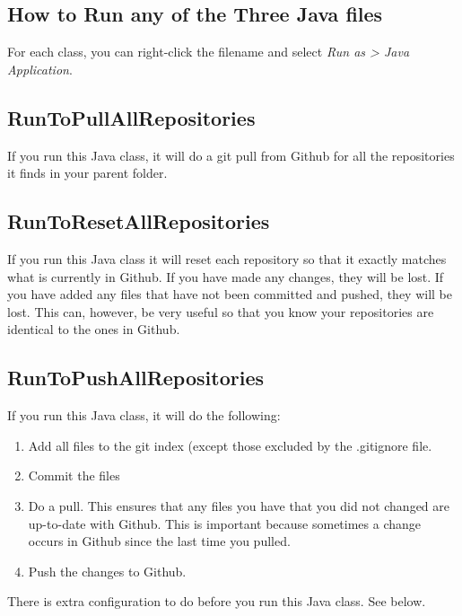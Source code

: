 \documentclass[]{memoir}
\begin{document}
\subsection{How to Run any of the Three Java files}

For each class, you can right-click the filename and select \textit{Run as > Java Application}.

\subsection{RunToPullAllRepositories}

If you run this Java class, it will do a git pull from Github for all the repositories it finds in your parent folder.

\subsection{RunToResetAllRepositories}

If you run this Java class it will reset each repository so that it exactly matches what is currently in Github.  If you have made any changes, they will be lost.  If you have added any files that have not been committed and pushed, they will be lost.  This can, however, be very useful so that you know your repositories are identical to the ones in Github.

\subsection{RunToPushAllRepositories}

If you run this Java class, it will do the following:

\begin{enumerate}
    \item Add all files to the git index (except those excluded by the .gitignore file.
    \item Commit the files
    \item Do a pull.  This ensures that any files you have that you did not changed are up-to-date with Github.  This is important because sometimes a change occurs in Github since the last time you pulled.
    \item Push the changes to Github.
\end{enumerate}

\begin{warning}
There is extra configuration to do before you run this Java class.  See below.
\end{warning}
\end{document}
